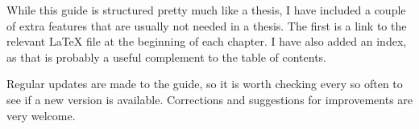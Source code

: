 While this guide is structured pretty much like a thesis, I have
included a couple of extra features that are usually not needed in a
thesis. The first is a link to the relevant \LaTeX{} file at the
beginning of each chapter. I have also added an index, as
that is probably a useful complement to the table of contents.

Regular updates are made to the guide, so it is worth checking every
so often to see if a new version is available. Corrections and
suggestions for improvements are very welcome.


